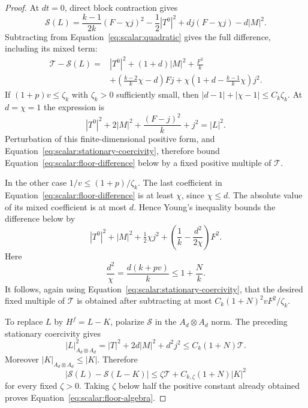 \begin{proof}
At $dt=0$, direct block contraction gives
\[
 \mathcal S(L)=\frac{k-1}{2k}(F-\chi j)^2
      -\frac12|T^0|^2+dj(F-\chi j)-d|M|^2.
\]
Subtracting from Equation~\eqref{eq:scalar:quadratic} gives the full
difference, including its mixed term:
\begin{equation}
 \begin{aligned}
 \mathcal T-\mathcal S(L)={}&|T^0|^2+(1+d)|M|^2+\frac{F^2}{k}\\
  &+\left(\frac{k-2}{k}\chi-d\right)Fj
        +\chi\left(1+d-\frac{k-1}{k}\chi\right)j^2.
 \end{aligned}
 \label{eq:scalar:floor-difference}
\end{equation}
If $(1+p)v\leq\zeta_k$ with $\zeta_k>0$ sufficiently small, then
$|d-1|+|\chi-1|\leq C_k\zeta_k$.  At $d=\chi=1$ the expression is
\[
 |T^0|^2+2|M|^2+\frac{(F-j)^2}{k}+j^2=|L|^2.
\]
Perturbation of this finite-dimensional positive form, and
Equation~\eqref{eq:scalar:stationary-coercivity}, therefore bound
Equation~\eqref{eq:scalar:floor-difference} below by a fixed positive
multiple of $\mathcal T$.

In the other case $1/v\leq(1+p)/\zeta_k$.  The last coefficient in
Equation~\eqref{eq:scalar:floor-difference} is at least $\chi$,
since $\chi\leq d$.  The absolute value of its mixed coefficient is
at most $d$.  Hence Young's inequality bounds the difference below by
\[
 |T^0|^2+|M|^2+\tfrac12\chi j^2
                  +\left(\frac1k-\frac{d^2}{2\chi}\right)F^2.
\]
Here
\[
 \frac{d^2}{\chi}=\frac{d(k+pv)}k\leq1+\frac Nk.
\]
It follows, again using
Equation~\eqref{eq:scalar:stationary-coercivity}, that the desired
fixed multiple of $\mathcal T$ is obtained after subtracting at most
$C_k(1+N)^2vF^2/\zeta_k$.

To replace $L$ by $H^f=L-K$, polarize $\mathcal S$ in the
$A_d\otimes A_d$ norm.  The preceding stationary coercivity gives
\[
 |L|_{A_d\otimes A_d}^2
   =|T|^2+2d|M|^2+d^2j^2\leq C_k(1+N)\mathcal T.
\]
Moreover $|K|_{A_d\otimes A_d}\leq|K|$.  Therefore
\[
 |\mathcal S(L)-\mathcal S(L-K)|
       \leq \zeta\mathcal T+C_{k,\zeta}(1+N)|K|^2
\]
for every fixed $\zeta>0$.  Taking $\zeta$ below half the positive
constant already obtained proves
Equation~\eqref{eq:scalar:floor-algebra}.


\end{proof}
